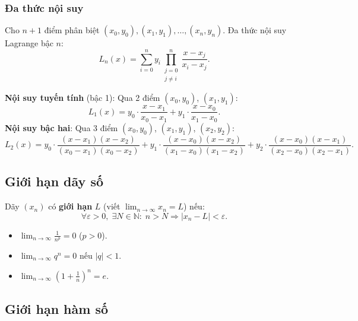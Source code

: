 \documentclass[12pt,a4paper]{article}
\begin{document}
\subsubsection{Đa thức nội suy}

\begin{dinhnghia}[title={Nội suy Lagrange}]
  Cho $n+1$ điểm phân biệt $(x_0, y_0), (x_1, y_1), \ldots, (x_n, y_n)$. Đa thức nội suy Lagrange bậc $n$:
  \[
    L_n(x) = \sum_{i=0}^{n} y_i \prod_{\substack{j=0 \\ j \ne i}}^{n} \frac{x - x_j}{x_i - x_j}.
  \]
\end{dinhnghia}

\begin{vidu}
  \textbf{Nội suy tuyến tính} (bậc 1): Qua 2 điểm $(x_0, y_0)$, $(x_1, y_1)$:
  \[
    L_1(x) = y_0 \cdot \frac{x - x_1}{x_0 - x_1} + y_1 \cdot \frac{x - x_0}{x_1 - x_0}.
  \]
  \textbf{Nội suy bậc hai}: Qua 3 điểm $(x_0, y_0)$, $(x_1, y_1)$, $(x_2, y_2)$:
  \[
    L_2(x) = y_0 \cdot \frac{(x-x_1)(x-x_2)}{(x_0-x_1)(x_0-x_2)} + y_1 \cdot \frac{(x-x_0)(x-x_2)}{(x_1-x_0)(x_1-x_2)} + y_2 \cdot \frac{(x-x_0)(x-x_1)}{(x_2-x_0)(x_2-x_1)}.
  \]
\end{vidu}

\subsection{Giới hạn dãy số}

\begin{dinhnghia}
  Dãy $(x_n)$ có \textbf{giới hạn} $L$ (viết $\displaystyle\lim_{n \to \infty} x_n = L$) nếu:
  \[
    \forall \varepsilon > 0,\; \exists N \in \mathbb{N}:\; n > N \Rightarrow |x_n - L| < \varepsilon.
  \]
\end{dinhnghia}

\begin{dinhly}[title={Giới hạn cơ bản}]
  \begin{itemize}
    \item $\displaystyle\lim_{n \to \infty} \frac{1}{n^p} = 0$ ($p > 0$).
    \item $\displaystyle\lim_{n \to \infty} q^n = 0$ nếu $|q| < 1$.
    \item $\displaystyle\lim_{n \to \infty} \left(1 + \frac{1}{n}\right)^n = e$.
  \end{itemize}
\end{dinhly}

\subsection{Giới hạn hàm số}
\end{document}
